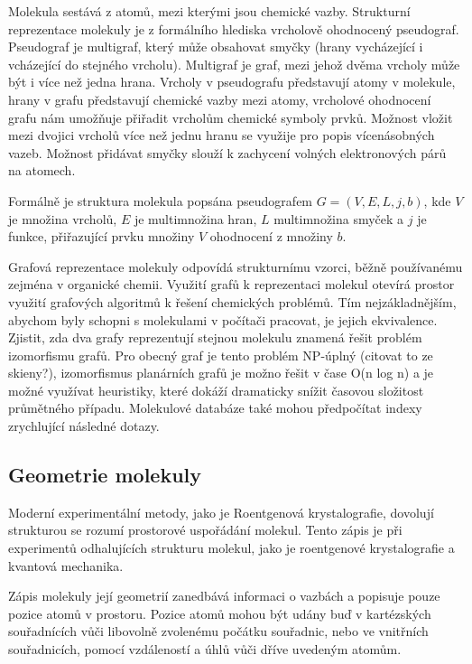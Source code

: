 \documentclass[10pt,draft,oneside]{fithesis2}
\begin{document}
Molekula sestává z atomů, mezi kterými jsou chemické vazby. Strukturní reprezentace molekuly je z formálního hlediska vrcholově ohodnocený pseudograf. Pseudograf je multigraf, který může obsahovat smyčky (hrany vycházející i vcházející do stejného vrcholu). Multigraf je graf, mezi jehož dvěma vrcholy může být i více než jedna hrana. Vrcholy v pseudografu představují atomy v molekule, hrany v grafu představují chemické vazby mezi atomy, vrcholové ohodnocení grafu nám umožňuje přiřadit vrcholům chemické symboly prvků. Možnost vložit mezi dvojici vrcholů více než jednu hranu se využije pro popis vícenásobných vazeb. Možnost přidávat smyčky slouží k zachycení volných elektronových párů na atomech.

Formálně je struktura molekula popsána pseudografem $G = (V, E, L, j, b)$, kde $V$ je množina vrcholů, $E$ je multimnožina hran, $L$ multimnožina smyček a $j$ je funkce, přiřazující prvku množiny $V$ ohodnocení z množiny $b$.

Grafová reprezentace molekuly odpovídá strukturnímu vzorci, běžně používanému zejména v organické chemii. Využití grafů k reprezentaci molekul otevírá prostor využití grafových algoritmů k řešení chemických problémů. Tím nejzákladnějším, abychom byly schopni s molekulami v počítači pracovat, je jejich ekvivalence. Zjistit, zda dva grafy reprezentují stejnou molekulu znamená řešit problém izomorfismu grafů. Pro obecný graf je tento problém NP-úplný (citovat to ze skieny?), izomorfismus planárních grafů je možno řešit v čase O(n log n) a je možné využívat heuristiky, které dokáží dramaticky snížit časovou složitost průmětného případu. Molekulové databáze také mohou předpočítat indexy zrychlující následné dotazy.

\subsection{Geometrie molekuly}

Moderní experimentální metody, jako je Roentgenová krystalografie, dovolují  strukturou se rozumí prostorové uspořádání molekul. Tento zápis je při experimentů odhalujících strukturu molekul, jako je roentgenové krystalografie a kvantová mechanika.

Zápis molekuly její geometrií zanedbává informaci o vazbách a popisuje pouze pozice atomů v prostoru. Pozice atomů mohou být udány buď v kartézských souřadnících vůči libovolně zvolenému počátku souřadnic, nebo ve vnitřních souřadnicích, pomocí vzdáleností a úhlů vůči dříve uvedeným atomům.
\end{document}
